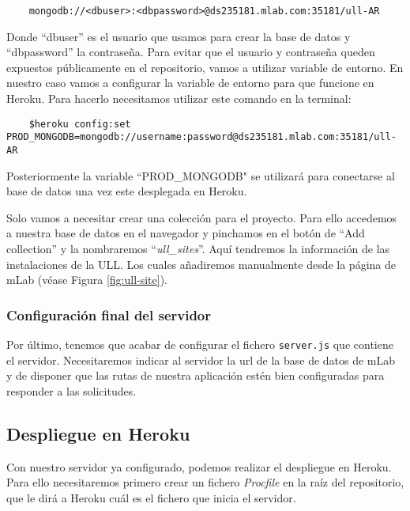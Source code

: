 \begin{lstlisting}
    mongodb://<dbuser>:<dbpassword>@ds235181.mlab.com:35181/ull-AR
\end{lstlisting}

Donde ``dbuser'' es el usuario que usamos para crear la base de datos y ``dbpassword'' la contraseña. Para evitar que el usuario y contraseña queden expuestos públicamente en el repositorio, vamos a utilizar variable de entorno. En nuestro caso vamos a configurar la variable de entorno para que funcione en Heroku. Para hacerlo necesitamos utilizar este comando en la terminal:

\begin{lstlisting}
    $heroku config:set PROD_MONGODB=mongodb://username:password@ds235181.mlab.com:35181/ull-AR
\end{lstlisting}

Posteriormente la variable ``PROD\_MONGODB" se utilizará para conectarse al base de datos una vez este desplegada en Heroku.

Solo vamos a necesitar crear una colección para el proyecto. Para ello accedemos a nuestra base de datos en el navegador y pinchamos en el botón de ``Add collection'' y la nombraremos ``\textit{ull\_sites}''. Aquí tendremos la información de las instalaciones de la ULL. Los cuales añadiremos manualmente desde la página de mLab (véase Figura \ref{fig:ull-site}).


\subsubsection{Configuración final del servidor}

Por último, tenemos que acabar de configurar el fichero \texttt{server.js} que contiene el servidor. Necesitaremos indicar al servidor la url de la base de datos de mLab y de disponer que las rutas de nuestra aplicación estén bien configuradas para responder a las solicitudes. 


\subsection{Despliegue en Heroku}

Con nuestro servidor ya configurado, podemos realizar el despliegue en Heroku. Para ello necesitaremos primero crear un fichero \textit{Procfile} en la raíz del repositorio, que le dirá a Heroku cuál es el fichero que inicia el servidor.

